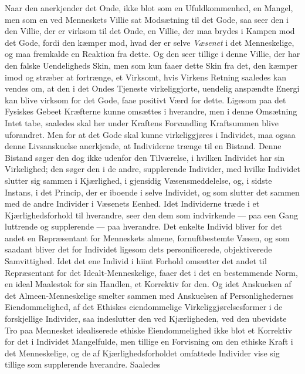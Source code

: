\documentclass[12pt,a4paper,openany]{book}
\newcommand{\opage}[1]{\marginnote{\footnotesize\textit{[#1]}}}
\begin{document}
Naar den anerkjender det Onde, ikke blot som en Ufuldkommenhed,
en Mangel, men som en ved Menneskets Villie
sat Modsætning til det Gode, saa seer den i den Villie, der
er virksom til det Onde, en Villie, der maa brydes i Kampen
mod det Gode, fordi den kæmper mod, hvad der er selve
\emph{Væsenet} i det Menneskelige, og maa fremkalde en Reaktion
fra dette. Og den seer tillige i denne Villie, der har den
falske Uendeligheds Skin, men som kun faaer dette Skin fra
det, den kæmper imod og stræber at fortrænge, et Virksomt,
\opage{506}hvis Virkens Retning saaledes kan vendes om, at den i det
Ondes Tjeneste virkeliggjorte, uendelig anspændte Energi kan
blive virksom for det Gode, faae positivt Værd for dette. Ligesom
paa det Fysiskes Gebeet Kræfterne kunne omsættes i hverandre,
men i denne Omsætning Intet tabe, saaledes skal her
under Kraftens Forvandling Kraftsummen blive uforandret.
Men for at det Gode skal kunne virkeliggjøres i Individet, maa
ogsaa denne Livsanskuelse anerkjende, at Individerne trænge til
en Bistand. Denne Bistand søger den dog ikke udenfor den
Tilværelse, i hvilken Individet har sin Virkelighed; den søger
den i de andre, supplerende Individer, med hvilke Individet
slutter sig sammen i Kjærlighed, i gjensidig Væsensmeddelelse,
og, i sidste Instans, i det Princip, der er iboende i selve Individet,
og som slutter det sammen med de andre Individer
i Væsenets Eenhed. Idet Individerne træde i et Kjærlighedsforhold
til hverandre, seer den dem som indvirkende — paa
een Gang luttrende og supplerende — paa hverandre. Det
enkelte Individ bliver for det andet en Repræsentant for
Menneskets almene, fornuftbestemte Væsen, og som saadant
bliver det for Individet ligesom dets personificerede, objektiverede
Samvittighed. Idet det ene Individ i hiint Forhold
omsætter det andet til Repræsentant for det Idealt-Menneskelige,
faaer det i det en bestemmende Norm, en ideal Maalestok
for sin Handlen, et Korrektiv for den. Og idet Anskuelsen
af det Almeen-Menneskelige smelter sammen med
Anskuelsen af Personlighedernes Eiendommelighed, af det
Ethiskes eiendommelige Virkeliggjørelsesformer i de forskjellige
Individer, saa indeslutter den ved Kjærligheden, ved den
ubevidste Tro paa Mennesket idealiserede ethiske Eiendommelighed
ikke blot et Korrektiv for det i Individet Mangelfulde,
men tillige en Forvisning om den ethiske Kraft i
det Menneskelige, og de af Kjærlighedsforholdet omfattede
Individer vise sig tillige som supplerende hverandre. Saaledes
\end{document}
